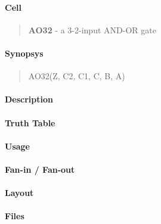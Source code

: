 \label{AO32}
\paragraph{Cell}
\begin{quote}
    \textbf{AO32} - a 3-2-input AND-OR gate
\end{quote}

\paragraph{Synopsys}
\begin{quote}
    AO32(Z, C2, C1, C, B, A)
\end{quote}

\paragraph{Description}

%

\paragraph{Truth Table}
%

\paragraph{Usage}

\paragraph{Fan-in / Fan-out}

\paragraph{Layout}

\paragraph{Files}
